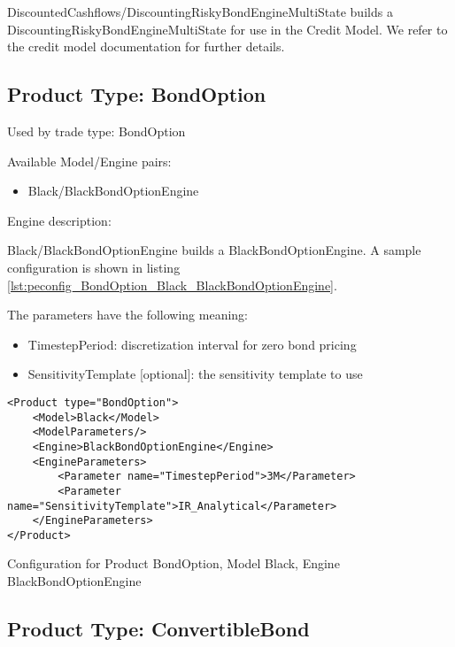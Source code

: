 DiscountedCashflows/DiscountingRiskyBondEngineMultiState builds a DiscountingRiskyBondEngineMultiState for use in the
Credit Model. We refer to the credit model documentation for further details.

\subsection{Product Type: BondOption}

Used by trade type: BondOption

Available Model/Engine pairs:

\begin{itemize}
\item Black/BlackBondOptionEngine
\end{itemize}

Engine description:

Black/BlackBondOptionEngine builds a BlackBondOptionEngine. A sample configuration is shown in listing
\ref{lst:peconfig_BondOption_Black_BlackBondOptionEngine}.

The parameters have the following meaning:

\begin{itemize}
\item TimestepPeriod: discretization interval for zero bond pricing
\item SensitivityTemplate [optional]: the sensitivity template to use 
\end{itemize}

\begin{longlisting}
\begin{verbatim}
<Product type="BondOption">
    <Model>Black</Model>
    <ModelParameters/>
    <Engine>BlackBondOptionEngine</Engine>
    <EngineParameters>
        <Parameter name="TimestepPeriod">3M</Parameter>
        <Parameter name="SensitivityTemplate">IR_Analytical</Parameter>
    </EngineParameters>
</Product>
\end{verbatim}
\caption{Configuration for Product BondOption, Model Black, Engine BlackBondOptionEngine}
\label{lst:peconfig_BondOption_Black_BlackBondOptionEngine}
\end{longlisting}

\subsection{Product Type: ConvertibleBond}

